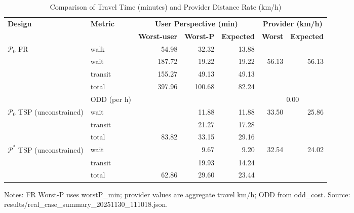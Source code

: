 \begin{table}[t]
\centering
\caption{Comparison of Travel Time (minutes) and Provider Distance Rate (km/h)}
\begin{tabular}{l l r r r r r}
\toprule
\textbf{Design} & \textbf{Metric} & 
\multicolumn{3}{c}{\textbf{User Perspective (min)}} & 
\multicolumn{2}{c}{\textbf{Provider (km/h)}} \\
\cmidrule(lr){3-5}\cmidrule(lr){6-7}
& & \textbf{Worst-user} & \textbf{Worst-P} & \textbf{Expected} & \textbf{Worst} & \textbf{Expected} \\
\midrule
$\mathcal{P}_0$ FR & walk    & 54.98 & 32.32 & 13.88 &        &        \\
                   & wait    & 187.72 & 19.22 & 19.22 & 56.13  & 56.13  \\
                   & transit & 155.27 & 49.13 & 49.13 &        &        \\
                   & total   & 397.96 & 100.68 & 82.24 &       &        \\
                   & ODD (per h) &  &  &  & \multicolumn{2}{c}{0.00} \\
\midrule
$\mathcal{P}_0$ TSP (unconstrained) & wait    &  & 11.88 & 11.88 & 33.50 & 25.86 \\
                                    & transit &  & 21.27 & 17.28 &        &       \\
                                    & total   & 83.82 & 33.15 & 29.16 &        &       \\
\midrule
$\mathcal{P}^*$ TSP (unconstrained) & wait    &  & 9.67 & 9.20 & 32.54 & 24.02 \\
                                    & transit &  & 19.93 & 14.24 &        &       \\
                                    & total   & 62.86 & 29.60 & 23.44 &        &       \\
\bottomrule
\end{tabular}

\vspace{0.5ex}
\small
Notes: FR Worst-P uses worstP\_min; provider values are aggregate travel km/h; ODD from odd\_cost. Source: results/real_case_summary_20251130_111018.json.
\end{table}